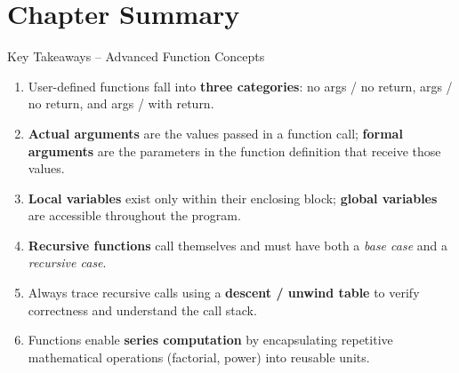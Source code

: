 \section{Chapter Summary}
\label{sec:ch2-summary}

\begin{importantbox}{Key Takeaways -- Advanced Function Concepts}
\begin{enumerate}
    \item User-defined functions fall into \textbf{three categories}:
          no args / no return, args / no return, and args / with return.
    \item \textbf{Actual arguments} are the values passed in a function call;
          \textbf{formal arguments} are the parameters in the function
          definition that receive those values.
    \item \textbf{Local variables} exist only within their enclosing block;
          \textbf{global variables} are accessible throughout the program.
    \item \textbf{Recursive functions} call themselves and must have both
          a \emph{base case} and a \emph{recursive case}.
    \item Always trace recursive calls using a \textbf{descent / unwind table}
          to verify correctness and understand the call stack.
    \item Functions enable \textbf{series computation} by encapsulating
          repetitive mathematical operations (factorial, power) into
          reusable units.
\end{enumerate}
\end{importantbox}
